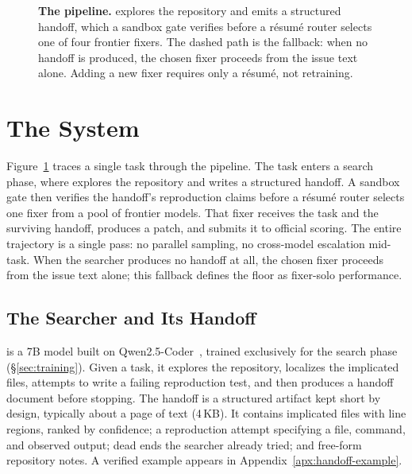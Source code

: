 
\begin{figure}[!t]
\centering

\caption{\textbf{The \sysname pipeline.}
\modelname explores the repository and emits a structured handoff, which a
sandbox gate verifies before a r\'esum\'e router selects one of four frontier
fixers.  The dashed path is the fallback: when no handoff is produced, the
chosen fixer proceeds from the issue text alone.  Adding a new fixer requires
only a r\'esum\'e, not retraining.}
\label{fig:pipeline}
\end{figure}

\section{The \sysname System}
\label{sec:system}

Figure~\ref{fig:pipeline} traces a single task through the pipeline.  The task
enters a search phase, where \modelname explores the repository and writes a
structured handoff.  A sandbox gate then verifies the handoff's reproduction
claims before a r\'esum\'e router selects one fixer from a pool of frontier
models.  That fixer receives the task and the surviving handoff, produces a
patch, and submits it to official scoring.  The entire trajectory is a single
pass: no parallel sampling, no cross-model escalation mid-task.  When the
searcher produces no handoff at all, the chosen fixer proceeds from the issue
text alone; this fallback defines the floor as fixer-solo performance.

\subsection{The Searcher and Its Handoff}
\label{sec:searcher}

\modelname is a 7B model built on Qwen2.5-Coder~\citep{qwen25coder}, trained
exclusively for the search phase (\S\ref{sec:training}).  Given a task, it
explores the repository, localizes the implicated files, attempts to write a
failing reproduction test, and then produces a handoff document before stopping.
The handoff is a structured artifact kept short by design, typically
about a page of text (4\,KB).  It contains implicated
files with line regions, ranked by confidence; a reproduction attempt specifying
a file, command, and observed output; dead ends the searcher already tried; and
free-form repository notes.  A verified example appears in
Appendix~\ref{apx:handoff-example}.

